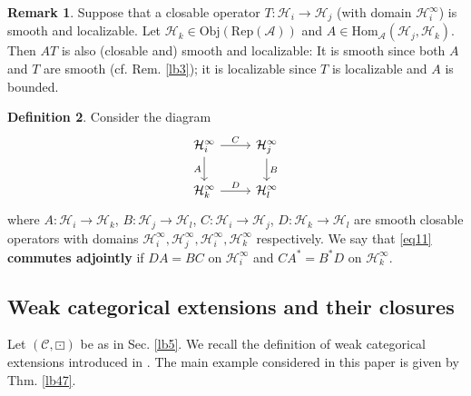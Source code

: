 \documentclass[11pt,b5paper,notitlepage]{article}
\theoremstyle{definition}
\newtheorem{df}{Definition}[section]
\newtheorem{rem}[df]{Remark}
\theoremstyle{plain}
\newcommand{\mc}{\mathcal}
\newcommand{\Hom}{\mathrm{Hom}}
\newcommand{\Rep}{\mathrm{Rep}}
\newcommand{\scr}{\mathscr}
\newcommand{\Obj}{\mathrm{Obj}}
\numberwithin{equation}{section}
\begin{document}
\begin{rem}\label{lb25}
Suppose that a closable operator $T:\mc H_i\rightarrow\mc H_j$ (with domain $\mc H_i^\infty$) is smooth and localizable. Let $\mc H_k\in\Obj(\Rep(\mc A))$ and $A\in\Hom_{\mc A}(\mc H_j,\mc H_k)$. Then $AT$ is also (closable and) smooth and localizable: It is smooth since both $A$ and $T$ are smooth (cf. Rem. \ref{lb3}); it is localizable since $T$ is localizable and $A$ is bounded.
\end{rem}



\begin{df}
Consider the diagram
\begin{equation}\label{eq11}
\begin{tikzcd}
\mc H_i^\infty \arrow[r,"C"] \arrow[d,"A"'] & \mc H_j^\infty \arrow[d,"B"] \\
\mc H_k^\infty \arrow[r,"D"]           & \mc H_l^\infty          
\end{tikzcd}
\end{equation}
where $A:\mc H_i\rightarrow\mc H_k$, $B:\mc H_j\rightarrow\mc H_l$, $C:\mc H_i\rightarrow\mc H_j$, $D:\mc H_k\rightarrow\mc H_l$ are smooth closable operators with domains $\mc H_i^\infty,\mc H_j^\infty,\mc H_i^\infty,\mc H_k^\infty$ respectively. We say that \eqref{eq11} \textbf{commutes adjointly} if $DA=BC$ on $\mc H_i^\infty$ and $CA^*=B^* D$ on $\mc H_k^\infty$.
\end{df}






\subsection{Weak categorical extensions and their closures}


Let $(\scr C,\boxdot)$ be as in Sec. \ref{lb5}. We recall the definition of weak categorical extensions introduced in \cite{Gui20}. The main example considered in this paper is given by Thm. \ref{lb47}.
\end{document}
